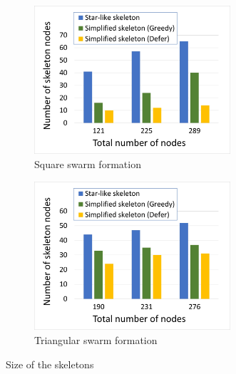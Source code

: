 \documentclass[a4paper,12pt]{report}
\begin{document}
\paragraph{}
\begin{figure}[tbph]
    \begin{subfigure}{1\linewidth}
    \centering
        \includegraphics[width=0.8\textwidth]{images/results_skeleton_square.jpg}
        \caption{Square swarm formation}
    \end{subfigure}
    
    \vspace{1cm}
    \begin{subfigure}{1\linewidth}
    \centering
        \includegraphics[width=0.8\textwidth]{images/results_skeleton_triagular.jpg}
        \caption{Triangular swarm formation}
    \end{subfigure}
\caption{Size of the skeletons}
\end{figure}
\end{document}
